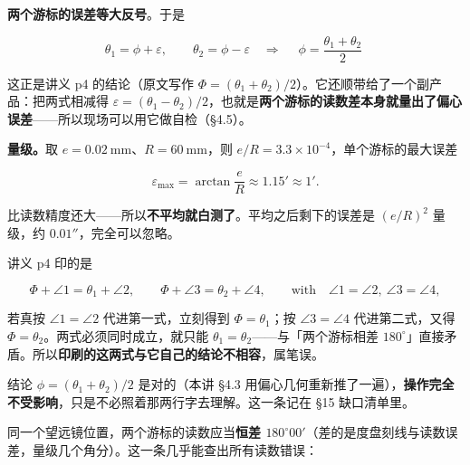 \documentclass[11pt]{ctexart}
\begin{document}
\textbf{两个游标的误差等大反号}。于是

\[
\theta_1=\phi+\varepsilon,\qquad \theta_2=\phi-\varepsilon
\quad\Longrightarrow\quad
\boxed{\;\phi=\frac{\theta_1+\theta_2}{2}\;}
\]

这正是讲义 p4 的结论（原文写作 $\Phi=(\theta_1+\theta_2)/2$）。它还顺带给了一个副产品：把两式相减得 $\varepsilon=(\theta_1-\theta_2)/2$，也就是\textbf{两个游标的读数差本身就量出了偏心误差}——所以现场可以用它做自检（§4.5）。

\textbf{量级。}取 $e=0.02\ \mathrm{mm}$、$R=60\ \mathrm{mm}$，则 $e/R=3.3\times10^{-4}$，单个游标的最大误差

\[
\varepsilon_{\max}=\arctan\frac{e}{R}\approx1.15'\approx1'.
\]

比读数精度还大——所以\textbf{不平均就白测了}。平均之后剩下的误差是 $(e/R)^2$ 量级，约 $0.01''$，完全可以忽略。



讲义 p4 印的是

\[
\Phi+\angle 1=\theta_1+\angle 2,\qquad \Phi+\angle 3=\theta_2+\angle 4,
\qquad\text{with}\quad \angle 1=\angle 2,\ \angle 3=\angle 4 ,
\]

若真按 $\angle 1=\angle 2$ 代进第一式，立刻得到 $\Phi=\theta_1$；按 $\angle 3=\angle 4$ 代进第二式，又得 $\Phi=\theta_2$。两式必须同时成立，就只能 $\theta_1=\theta_2$——与「两个游标相差 $180^{\circ}$」直接矛盾。所以\textbf{印刷的这两式与它自己的结论不相容}，属笔误。

结论 $\phi=(\theta_1+\theta_2)/2$ 是对的（本讲 §4.3 用偏心几何重新推了一遍），\textbf{操作完全不受影响}，只是不必照着那两行字去理解。这一条记在 §15 缺口清单里。


同一个望远镜位置，两个游标的读数应当\textbf{恒差 $180^{\circ}00'$}（差的是度盘刻线与读数误差，量级几个角分）。这一条几乎能查出所有读数错误：
\end{document}
